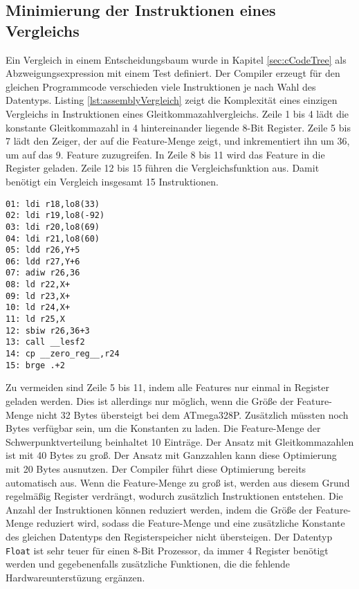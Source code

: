 \subsection{Minimierung der Instruktionen eines Vergleichs}
Ein Vergleich in einem Entscheidungsbaum wurde in Kapitel \ref{sec:cCodeTree} als Abzweigungsexpression mit einem Test definiert. Der Compiler erzeugt für den gleichen Programmcode verschieden viele Instruktionen
je nach Wahl des Datentyps.
\newline
\newline
Listing \ref{lst:assemblyVergleich} zeigt die Komplexität eines einzigen Vergleichs in Instruktionen eines Gleitkommazahlvergleichs. Zeile 1 bis 4 lädt die konstante Gleitkommazahl in 4 hintereinander liegende
8-Bit Register. Zeile 5 bis 7 lädt den Zeiger, der auf die Feature-Menge zeigt, und inkrementiert ihn um 36, um auf das 9. Feature zuzugreifen. In Zeile 8 bis 11 wird das Feature in die Register geladen. Zeile 12 bis 15 führen die
Vergleichsfunktion aus. Damit benötigt ein Vergleich insgesamt 15 Instruktionen.
\begin{lstlisting}[label=lst:assemblyVergleich,caption={Vergleich von Feature als Gleitkommazahl mit konstanter Gleitkommazahl.}]
01: ldi r18,lo8(33)
02: ldi r19,lo8(-92)
03: ldi r20,lo8(69)
04: ldi r21,lo8(60)
05: ldd r26,Y+5
06: ldd r27,Y+6
07: adiw r26,36
08: ld r22,X+
09: ld r23,X+
10: ld r24,X+
11: ld r25,X
12: sbiw r26,36+3
13: call __lesf2
14: cp __zero_reg__,r24
15: brge .+2
\end{lstlisting}
Zu vermeiden sind Zeile 5 bis 11, indem alle Features nur einmal in Register geladen werden. Dies ist allerdings nur möglich, wenn die Größe der Feature-Menge nicht 32 Bytes übersteigt bei dem
ATmega328P. Zusätzlich müssten noch Bytes verfügbar sein, um die Konstanten zu laden. Die Feature-Menge der Schwerpunktverteilung beinhaltet 10 Einträge. Der Ansatz mit Gleitkommazahlen ist mit 40 Bytes zu groß.
Der Ansatz mit Ganzzahlen kann diese Optimierung mit 20 Bytes ausnutzen. Der Compiler führt diese Optimierung bereits automatisch aus. Wenn die Feature-Menge zu groß ist, werden aus diesem Grund regelmäßig
Register verdrängt, wodurch zusätzlich Instruktionen entstehen. Die Anzahl der Instruktionen können reduziert werden, indem die Größe der Feature-Menge reduziert wird, sodass die Feature-Menge und eine
zusätzliche Konstante des gleichen Datentyps den Registerspeicher nicht übersteigen.
\newline
\newline
Der Datentyp \texttt{Float} ist sehr teuer für einen 8-Bit Prozessor, da immer 4 Register benötigt werden und gegebenenfalls zusätzliche Funktionen, die die fehlende Hardwareunterstüzung ergänzen.
